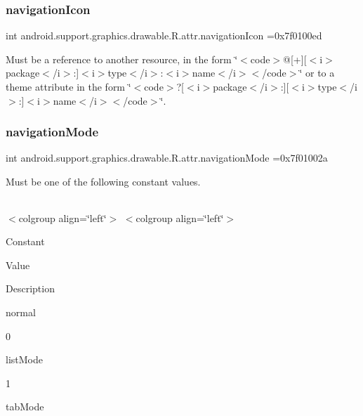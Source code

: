 \subsubsection{\texorpdfstring{navigation\+Icon}{navigationIcon}}
{\footnotesize\ttfamily int android.\+support.\+graphics.\+drawable.\+R.\+attr.\+navigation\+Icon =0x7f0100ed\hspace{0.3cm}{\ttfamily [static]}}

Must be a reference to another resource, in the form \char`\"{}$<$code$>$@\mbox{[}+\mbox{]}\mbox{[}$<$i$>$package$<$/i$>$\+:\mbox{]}$<$i$>$type$<$/i$>$\+:$<$i$>$name$<$/i$>$$<$/code$>$\char`\"{} or to a theme attribute in the form \char`\"{}$<$code$>$?\mbox{[}$<$i$>$package$<$/i$>$\+:\mbox{]}\mbox{[}$<$i$>$type$<$/i$>$\+:\mbox{]}$<$i$>$name$<$/i$>$$<$/code$>$\char`\"{}. \mbox{\label{classandroid_1_1support_1_1graphics_1_1drawable_1_1R_1_1attr_a959d057d3a4ae0ac52199424242b8220}} 
\subsubsection{\texorpdfstring{navigation\+Mode}{navigationMode}}
{\footnotesize\ttfamily int android.\+support.\+graphics.\+drawable.\+R.\+attr.\+navigation\+Mode =0x7f01002a\hspace{0.3cm}{\ttfamily [static]}}

Must be one of the following constant values.

\tabulinesep=1mm
\begin{longtabu} spread 0pt [c]{*{0}{|X[-1]}|}
\hline
\end{longtabu}
$<$colgroup align=\char`\"{}left\char`\"{}$>$ $<$colgroup align=\char`\"{}left\char`\"{}$>$ 

Constant

Value

Description 

{\ttfamily normal}

0

{\ttfamily list\+Mode}

1

{\ttfamily tab\+Mode}


